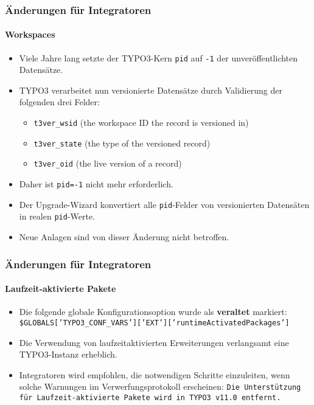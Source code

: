 \begin{frame}[fragile]
	\frametitle{Änderungen für Integratoren}
	\framesubtitle{Workspaces}

	\begin{itemize}
		\item Viele Jahre lang setzte der TYPO3-Kern \texttt{pid} auf \texttt{-1} der unveröffentlichten Datensätze.
		\item TYPO3 verarbeitet nun versionierte Datensätze durch Validierung der folgenden drei Felder:

			\begin{itemize}
				\item \texttt{t3ver\_wsid} (the workspace ID the record is versioned in)
				\item \texttt{t3ver\_state} (the type of the versioned record)
				\item \texttt{t3ver\_oid} (the live version of a record)
			\end{itemize}

		\item Daher ist \texttt{pid=-1} nicht mehr erforderlich.
		\item Der Upgrade-Wizard konvertiert alle \texttt{pid}-Felder von versionierten Datensäten
			in realen \texttt{pid}-Werte.
		\item Neue Anlagen sind von dieser Änderung nicht betroffen.

	\end{itemize}

\end{frame}


\begin{frame}[fragile]
	\frametitle{Änderungen für Integratoren}
	\framesubtitle{Laufzeit-aktivierte Pakete}

	\begin{itemize}
		\item Die folgende globale Konfigurationsoption wurde als \textbf{veraltet} markiert:\newline
			\smaller
				\texttt{\$GLOBALS['TYPO3\_CONF\_VARS']['EXT']['runtimeActivatedPackages']}
			\normalsize
		\item Die Verwendung von laufzeitaktivierten Erweiterungen verlangsamt eine TYPO3-Instanz erheblich.
		\item Integratoren wird empfohlen, die notwendigen Schritte einzuleiten, wenn solche Warnungen
			im Verwerfungsprotokoll erscheinen:\newline
			\begingroup
				\fontsize{8}{10}
				\texttt{Die Unterstützung für Laufzeit-aktivierte Pakete wird in TYPO3 v11.0 entfernt.}
			\endgroup

	\end{itemize}

\end{frame}


